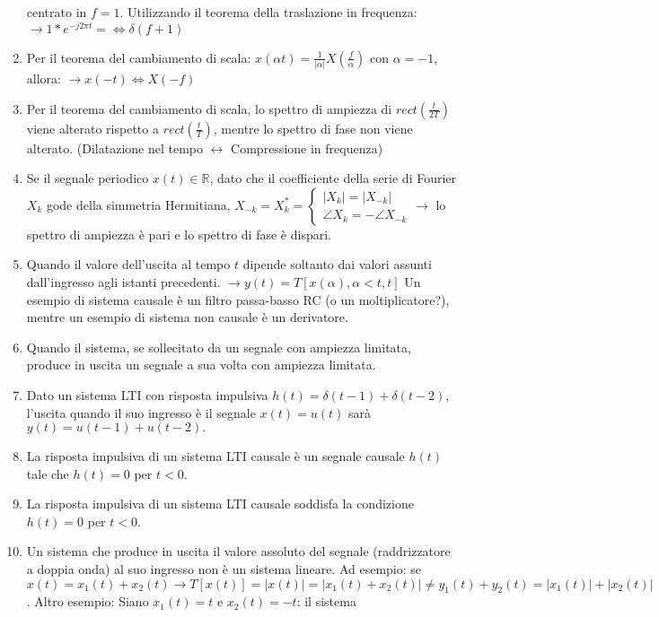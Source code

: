 \documentclass[
  paper=a4,
  ,captions=tableheading
]{scrartcl}
\begin{document}
\begin{enumerate}
  centrato in \(f = 1\). Utilizzando il teorema della traslazione in
  frequenza: \(\to 1*e^{-j2 \pi t} =\Leftrightarrow \delta (f+1)\)
\item
  Per il teorema del cambiamento di scala:
  \(\displaystyle x(\alpha t) = \frac{1}{|\alpha|} X(\frac{f}{\alpha})\)
  con \(\alpha = -1\), allora: \(\to x(-t) \Leftrightarrow X(-f)\)
\item
  Per il teorema del cambiamento di scala, lo spettro di ampiezza di
  \(rect(\frac{t}{2T})\) viene alterato rispetto a
  \(rect(\frac{t}{T})\), mentre lo spettro di fase non viene alterato.
  (Dilatazione nel tempo \(\leftrightarrow\) Compressione in frequenza)
\item
  Se il segnale periodico \(x(t) \in \mathbb{R}\), dato che il
  coefficiente della serie di Fourier \(X_k\) gode della simmetria
  Hermitiana,
  \(X_{-k} =X_k^* = \begin{cases} |X_k| =|X_{-k}| \\ \angle X_k = - \angle X_{-k} \end{cases} \to\)
  lo spettro di ampiezza è pari e lo spettro di fase è dispari.
\item
  Quando il valore dell'uscita al tempo \(t\) dipende soltanto dai
  valori assunti dall'ingresso agli istanti precedenti.
  \(\to y(t) = T[x(\alpha), \alpha < t, t]\) Un esempio di sistema
  causale è un filtro passa-basso RC (o un moltiplicatore?), mentre un
  esempio di sistema non causale è un derivatore.
\item
  Quando il sistema, se sollecitato da un segnale con ampiezza limitata,
  produce in uscita un segnale a sua volta con ampiezza limitata.
\item
  Dato un sistema LTI con risposta impulsiva
  \(h(t) = \delta(t - 1) + \delta(t - 2)\), l'uscita quando il suo
  ingresso è il segnale \(x(t) = u(t)\) sarà
  \(y(t) = u(t - 1) + u(t - 2).\)
\item
  La risposta impulsiva di un sistema LTI causale è un segnale causale
  \(h(t)\) tale che \(h(t) = 0\) per \(t < 0\).
\item
  La risposta impulsiva di un sistema LTI causale soddisfa la condizione
  \(h(t) = 0\) per \(t < 0\).
\item
  Un sistema che produce in uscita il valore assoluto del segnale
  (raddrizzatore a doppia onda) al suo ingresso non è un sistema
  lineare. Ad esempio: se
  \(\displaystyle x(t)=  x_1(t)+x_2(t) \to T[x(t)]  = |x(t)| = |x_1(t)+x_2(t)| \neq y_1(t)+y_2(t) = |x_1(t)|+|x_2(t)|\).
  Altro esempio: Siano \(x_1(t) = t\) e \(x_2(t) = -t\): il sistema

\end{enumerate}
\end{document}

